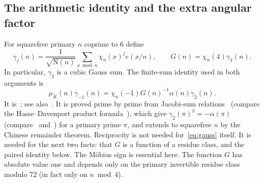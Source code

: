 \documentclass[11pt]{article}
\numberwithin{equation}{section}
\newcommand{\N}{\mathrm N}
\newcommand{\muk}{\mu_K}
\begin{document}
\subsection{The arithmetic identity and the extra angular factor}
For squarefree primary $n$ coprime to $6$ define
\begin{equation}\label{eq:d036}
 \gamma_j(n)=\frac1{\sqrt{\N(n)}}
                 \sum_{x\bmod n}\chi_n(x)^j e(x/n),\qquad
 G(n)=\overline{\chi_n(4)}\gamma_3(n).
\end{equation}
In particular, $\gamma_2$ is a cubic Gauss sum. The finite-sum identity
used in both arguments is
\begin{equation}\label{eq:gauss}
 \muk(n)\gamma_{-1}(n)
 =\chi_n(-1)G(n)^{-1}\overline{\alpha(n)}\gamma_2(n).
\end{equation}
It is~\cite[Lemma~4.1]{OAI1112}; see also~\cite[Proposition~18]{QF}. It is proved prime
by prime from Jacobi-sum relations~\cite[Chapter~8]{IR} (compare the Hasse--Davenport product formula~\cite{DH35}), which give $\gamma_2(\pi)^3=-\alpha(\pi)$ (compare~\cite[pp.~443--445]{Has50} and~\cite[(2)]{HB00}) for a primary
prime $\pi$, and extends to squarefree $n$ by the Chinese remainder theorem. Reciprocity is
not needed for~\eqref{eq:gauss} itself. It is needed for the next two facts: that $G$ is a
function of a residue class, and the paired identity below. The M\"obius sign is essential
here. The function $G$ has absolute value one and depends only on the primary invertible
residue class modulo $72$ (in fact only on $n\bmod4$).
\end{document}
